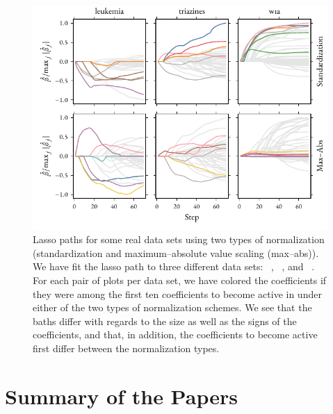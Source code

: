 \begin{figure}[htpb]
  \centering
  \includegraphics[]{figures/realdata_paths.pdf}
  \caption{%
    Lasso paths for some real data sets using two types of normalization (standardization and maximum--absolute value scaling (max--abs)). We have fit the lasso path to three different data sets: ~\parencite{golub1999}, ~\parencite{king}, and ~\parencite{platt1998}. For each pair of plots per data set, we have colored the coefficients if they were among the first ten coefficients to become active in under either of the two types of normalization schemes. We see that the baths differ with regards to the size as well as the signs of the coefficients, and that, in addition, the coefficients to become active first differ between the normalization types.
  }
  \label{fig:normalized-realdata-lasso-paths}
\end{figure}

\section{Summary of the Papers}


